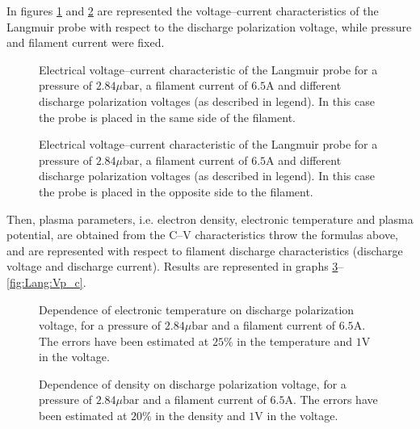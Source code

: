 \documentclass[11pt,a4 paper]{article}
\begin{document}
In figures \ref{fig:Lang:dx} and \ref{fig:Lang:sx} are represented the voltage--current characteristics of the Langmuir probe with respect to the discharge polarization voltage, while pressure and filament current were fixed.

\begin{figure}[H]
	\centering
	\caption{Electrical voltage--current characteristic of the Langmuir probe for a pressure of $2.84\si{\mu\bar}$, a filament current of $6.5\si{\ampere}$ and different discharge polarization voltages (as described in legend). In this case the probe is placed in the same side of the filament.}
	\label{fig:Lang:dx}
\end{figure}
\begin{figure}[H]
	\centering
	\caption{Electrical voltage--current characteristic of the Langmuir probe for a pressure of $2.84\si{\mu\bar}$, a filament current of $6.5\si{\ampere}$ and different discharge polarization voltages (as described in legend). In this case the probe is placed in the opposite side to the filament.}
	\label{fig:Lang:sx}
\end{figure}

Then, plasma parameters, i.e. electron density, electronic temperature and plasma potential, are obtained from the C--V characteristics throw the formulas above, and are represented with respect to filament  discharge characteristics (discharge voltage and discharge current). Results are represented in graphs \ref{fig:Lang:Te}--\ref{fig:Lang:Vp_c}.

\begin{figure}[H]
	\centering
	\caption{Dependence of electronic temperature on discharge polarization voltage, for a pressure of $2.84\si{\mu\bar}$ and a filament current of $6.5\si{\ampere}$. The errors have been estimated at $25\%$ in the temperature and $1\si{\volt}$ in the voltage.}
	\label{fig:Lang:Te}
\end{figure}

\begin{figure}[H]
	\centering
	\caption{Dependence of density on discharge polarization voltage, for a pressure of $2.84\si{\mu\bar}$ and a filament current of $6.5\si{\ampere}$. The errors have been estimated at $20\%$ in the density and $1\si{\volt}$ in the voltage.}
	\label{fig:Lang:n}
\end{figure}
\end{document}
